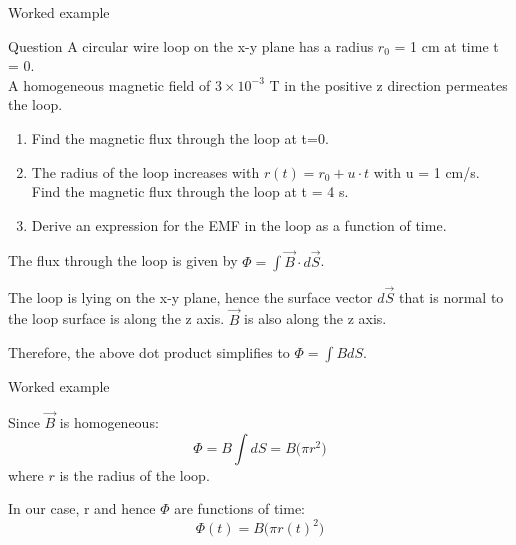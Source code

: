 {
\problemslide

%
%
%

\begin{frame}{Worked example }

\begin{blockexmplque}{Question}
A circular wire loop on the x-y plane has a radius $r_0$ = 1 cm at time t = 0. \\
A homogeneous magnetic field of $3 \times 10^{-3}$ T in the positive z direction permeates the loop.
\begin{enumerate}
  \item Find the magnetic flux through the loop at t=0.
  \item The radius of the loop increases with $\displaystyle r(t) = r_0 + u \cdot t$
        with u = 1 cm/s. Find the magnetic flux through the loop at t = 4 s.
  \item Derive an expression for the EMF in the loop as a function of time.
\end{enumerate}
\end{blockexmplque}

\vspace{0.1cm}


The flux through the loop is given by  $\displaystyle \Phi = \int \vec{B} \cdot d\vec{S}$.

The loop is lying on the x-y plane, hence the surface vector
$d\vec{S}$ that is normal to the loop surface is along the z axis.
$\vec{B}$ is also along the z axis.

Therefore, the above dot product simplifies to $\displaystyle \Phi = \int B dS$.

\end{frame}

%
%
%

\begin{frame}{Worked example }

Since $\vec{B}$ is homogeneous:
\begin{equation*}
     \Phi = B \int  dS =  B \Big( \pi r^2\Big)
\end{equation*}
where $r$ is the radius of the loop.

\vspace{0.4cm}

In our case, r and hence $\Phi$ are functions of time:
\begin{equation*}
     \Phi(t) = B \Big( \pi r(t)^2\Big)
\end{equation*}

\vspace{0.3cm}


\end{frame}}
